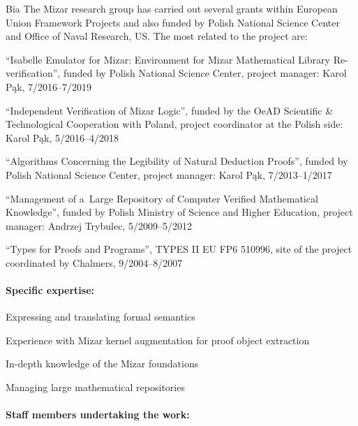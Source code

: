 \begin{sitedescription}{Bia}
The Mizar research group has carried out several grants within European Union Framework Projects 
and also funded by Polish National Science Center and Office of Naval Research, US.
The most related to the project are:

\begin{compactitem}
\item ``Isabelle Emulator for Mizar: Environment for Mizar Mathematical Library Re-verification'',
funded by Polish National Science Center, project manager: Karol Pąk, 7/2016--7/2019
\item ``Independent Verification of Mizar Logic'', funded by the OeAD Scientific \& Technological Cooperation with Poland,
project coordinator at the Polish side: Karol Pąk, 5/2016--4/2018
\item ``Algorithms Concerning the Legibility of Natural Deduction Proofs'', funded by Polish National Science Center,
project manager: Karol Pąk, 7/2013--1/2017
\item ``Management of a~Large Repository of Computer Verified Mathematical Knowledge'',
funded by Polish Ministry of Science and Higher Education, project manager: Andrzej Trybulec, 5/2009--5/2012
\item ``Types for Proofs and Programs'', TYPES II EU FP6 510996,
site of the project coordinated by Chalmers, 9/2004--8/2007
\end{compactitem}

\paragraph{Specific expertise:}

\begin{compactitem}
\item Expressing and translating formal semantics
\item Experience with Mizar kernel augmentation for proof object extraction
\item In-depth knowledge of the Mizar foundations
\item Managing large mathematical repositories
\end{compactitem}

\paragraph{Staff members undertaking the work:}

\begin{compactitem}


\end{compactitem}
\end{sitedescription}

